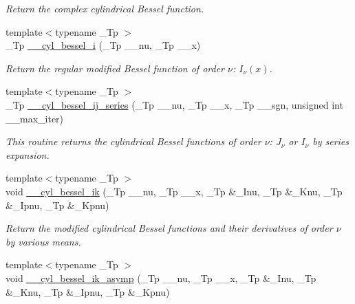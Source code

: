 \begin{DoxyCompactItemize}
\begin{DoxyCompactList}\small\item\em Return the complex cylindrical Bessel function. \end{DoxyCompactList}\item 
{\footnotesize template$<$typename \+\_\+\+Tp $>$ }\\\+\_\+\+Tp \hyperlink{namespacestd_1_1____detail_a72e3392d5c03c0bc8f2b5ffb8c1304b5}{\+\_\+\+\_\+cyl\+\_\+bessel\+\_\+i} (\+\_\+\+Tp \+\_\+\+\_\+nu, \+\_\+\+Tp \+\_\+\+\_\+x)
\begin{DoxyCompactList}\small\item\em Return the regular modified Bessel function of order $ \nu $\+: $ I_{\nu}(x) $. \end{DoxyCompactList}\item 
{\footnotesize template$<$typename \+\_\+\+Tp $>$ }\\\+\_\+\+Tp \hyperlink{namespacestd_1_1____detail_a8b52f1f93a90b9ed2504521e0ea440f5}{\+\_\+\+\_\+cyl\+\_\+bessel\+\_\+ij\+\_\+series} (\+\_\+\+Tp \+\_\+\+\_\+nu, \+\_\+\+Tp \+\_\+\+\_\+x, \+\_\+\+Tp \+\_\+\+\_\+sgn, unsigned int \+\_\+\+\_\+max\+\_\+iter)
\begin{DoxyCompactList}\small\item\em This routine returns the cylindrical Bessel functions of order $ \nu $\+: $ J_{\nu} $ or $ I_{\nu} $ by series expansion. \end{DoxyCompactList}\item 
{\footnotesize template$<$typename \+\_\+\+Tp $>$ }\\void \hyperlink{namespacestd_1_1____detail_af699e7a6d31556df09f0a0db4f196cc0}{\+\_\+\+\_\+cyl\+\_\+bessel\+\_\+ik} (\+\_\+\+Tp \+\_\+\+\_\+nu, \+\_\+\+Tp \+\_\+\+\_\+x, \+\_\+\+Tp \&\+\_\+\+Inu, \+\_\+\+Tp \&\+\_\+\+Knu, \+\_\+\+Tp \&\+\_\+\+Ipnu, \+\_\+\+Tp \&\+\_\+\+Kpnu)
\begin{DoxyCompactList}\small\item\em Return the modified cylindrical Bessel functions and their derivatives of order $ \nu $ by various means. \end{DoxyCompactList}\item 
{\footnotesize template$<$typename \+\_\+\+Tp $>$ }\\void \hyperlink{namespacestd_1_1____detail_a7386732bb6f0d45bbcbccaad436797a0}{\+\_\+\+\_\+cyl\+\_\+bessel\+\_\+ik\+\_\+asymp} (\+\_\+\+Tp \+\_\+\+\_\+nu, \+\_\+\+Tp \+\_\+\+\_\+x, \+\_\+\+Tp \&\+\_\+\+Inu, \+\_\+\+Tp \&\+\_\+\+Knu, \+\_\+\+Tp \&\+\_\+\+Ipnu, \+\_\+\+Tp \&\+\_\+\+Kpnu)

\end{DoxyCompactItemize}
